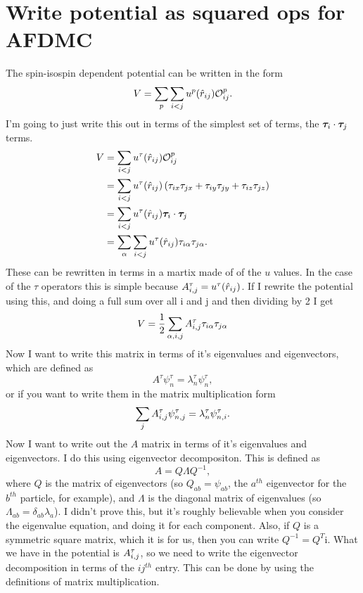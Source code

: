 \section{Write potential as squared ops for AFDMC}
\label{app:hsprep}
The spin-isospin dependent potential can be written in the form
\begin{equation}
   V = \sum\limits_p\sum\limits_{i<j} u^p(\hat{r}_{ij})\mathcal{O}^p_{ij}.
\end{equation}
I'm going to just write this out in terms of the simplest set of terms, the $\bm{\tau}_i\cdot\bm{\tau}_j$ terms.
\begin{align}
   V &= \sum\limits_{i<j} u^\tau(\hat{r}_{ij})\mathcal{O}^p_{ij} \\
   &= \sum\limits_{i<j} u^\tau(\hat{r}_{ij})\left(\tau_{ix}\tau_{jx}+\tau_{iy}\tau_{jy}+\tau_{iz}\tau_{jz}\right) \\
   &= \sum\limits_{i<j} u^\tau(\hat{r}_{ij})\bm{\tau}_i\cdot\bm{\tau}_j \\
   &= \sum\limits_\alpha\sum\limits_{i<j} u^\tau(\hat{r}_{ij})\tau_{i\alpha}\tau_{j\alpha}.
\end{align}
These can be rewritten in terms in a martix made of of the $u$ values. In the case of the $\tau$ operators this is simple because $A^{\tau}_{i,j}=u^\tau(\hat{r}_{ij})$. If I rewrite the potential using this, and doing a full sum over all i and j and then dividing by 2 I get
\begin{equation}
   V = \frac{1}{2}\sum\limits_{\alpha,i,j} A^{\tau}_{i,j}\tau_{i\alpha}\tau_{j\alpha}
\end{equation}
Now I want to write this matrix in terms of it's eigenvalues and eigenvectors, which are defined as
\begin{equation}
   A^{\tau}\psi_n^\tau=\lambda_n^\tau\psi_n^\tau,
\end{equation}
or if you want to write them in the matrix multiplication form
\begin{equation}
   \sum\limits_jA^{\tau}_{i,j}\psi_{n,j}^\tau = \lambda_n^\tau\psi_{n,i}^\tau.
\end{equation}
Now I want to write out the $A$ matrix in terms of it's eigenvalues and eigenvectors. I do this using eigenvector decompositon. This is defined as
\begin{equation}
   A=Q\Lambda Q^{-1},
\end{equation}
where $Q$ is the matrix of eigenvectors (so $Q_{ab}=\psi_{ab}$, the $a^{th}$ eigenvector for the $b^{th}$ particle, for example), and $\Lambda$ is the diagonal matrix of eigenvalues (so $\Lambda_{ab}=\delta_{ab}\lambda_a$). I didn't prove this, but it's roughly believable when you consider the eigenvalue equation, and doing it for each component. Also, if $Q$ is a symmetric square matrix, which it is for us, then you can write $Q^{-1}=Q^T$i. What we have in the potential is $A^{\tau}_{i,j}$, so we need to write the eigenvector decomposition in terms of the $ij^{th}$ entry. This can be done by using the definitions of matrix multiplication.
